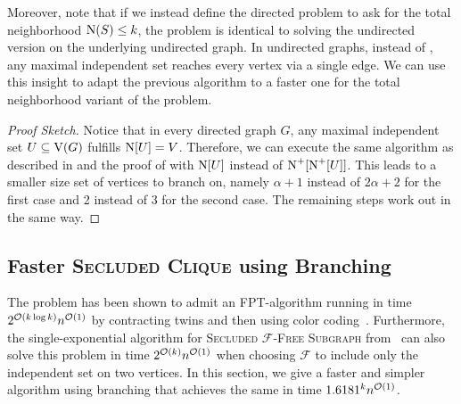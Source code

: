 \begin{lemma}
\begin{comment}
\begin{corollary}\label{cor:undir_ab}
  \secuna{$\alpha$} is solvable in time $(\alpha+1)^kn^{\alpha+\bigO{1}}$.
\end{corollary}
\fi
\end{comment}

Moreover, note that if we instead define the directed problem to ask for the total neighborhood $\operatorname{N}({S}) \le k$, the problem is identical to solving the undirected version on the underlying undirected graph. 
In undirected graphs, instead of , any maximal independent set reaches every vertex via a single edge. We can use this insight to adapt the previous algorithm to a faster one for the total neighborhood variant of the problem.

\restateabtotal*
\begin{proof}[Proof Sketch]
    Notice that in every directed graph $G$, any maximal independent set $U \subseteq \operatorname{V}({G})$ fulfills $\operatorname{N}[{U}] = V$. Therefore, we can execute the same algorithm as described in  and the proof of  with $\operatorname{N}[{U}]$ instead of $\operatorname{\operatorname{N}^+}[{\operatorname{\operatorname{N}^+}[{U}]}]$. This leads to a smaller size set of vertices to branch on, namely $\alpha + 1$ instead of $2\alpha + 2$ for the first case and 2 instead of 3 for the second case. The remaining steps work out in the same way.
\end{proof}

\subsection{Faster \textsc{Secluded Clique} using Branching}\label{sec:clique}

The \clique{} problem has been shown to admit an FPT-algorithm running in time $2^{\mathcal{O}(k \log k)}n^{\mathcal{O}(1)}$ by contracting twins and then using color coding~\cite{golovach2020finding}. Furthermore, the single-exponential algorithm for \textsc{Secluded $\mathcal{F}$-Free Subgraph} from~\cite{jansen2023single} can also solve this problem in time $2^{\mathcal{O}(k)}n^{\mathcal{O}(1)}$ when choosing $\mathcal{F}$ to include only the independent set on two vertices. 
In this section, we give a faster and simpler algorithm using branching that achieves the same in time $1.6181^k n^{\mathcal{O}(1)}$.



\end{lemma}
